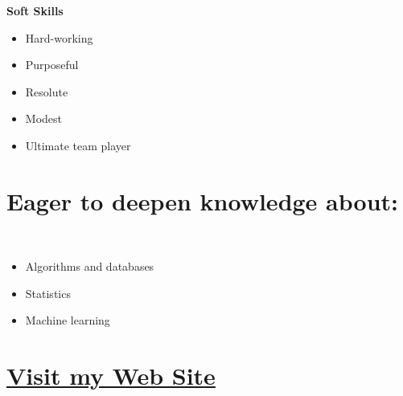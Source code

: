 \documentclass[]{friggeri-cv_reccius-experiment}
\begin{document}
\begin{aside}
  	\skillspace
	\textbf{Soft Skills}\\\vspace{0.4mm}
	\begin{itemize}[leftmargin=*, noitemsep]	
	\item Hard-working
	\item Purposeful
	\item Resolute
	\item Modest
	\item Ultimate team player\\
	\end{itemize}	

  \vspace{-2.6mm}
  \section{Eager to deepen knowledge about:}\\
  	\begin{itemize}[leftmargin=*, noitemsep]
	\vspace{3mm}
	\item Algorithms and databases
	\item Statistics
	\item Machine learning
	\end{itemize}	
  
  \vspace{-2.7mm}

  \vspace{-2.6mm}
  \section{\href{https://sevocrear.github.io/}{Visit my Web Site\faMousePointer}}\\
  \vspace{-2.7mm}
\end{aside}
~
\newcommand{\belowspace}{\vspace*{0.85mm}}
\end{document}

